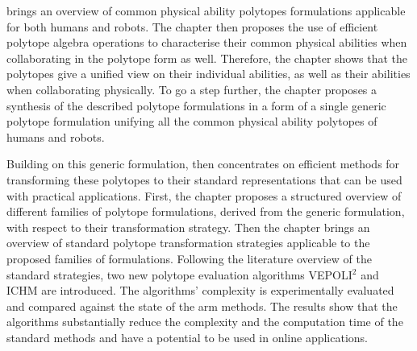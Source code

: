 
 brings an overview of common physical ability polytopes formulations applicable for both humans and robots. The chapter then proposes the use of efficient polytope algebra operations to characterise their common physical abilities when collaborating in the polytope form as well. Therefore, the chapter shows that the polytopes give a unified view on their individual abilities, as well as their abilities when collaborating physically. To go a step further, the chapter proposes a synthesis of the described polytope formulations in a form of a single generic polytope formulation unifying all the common physical ability polytopes of humans and robots.



Building on this generic formulation,  then concentrates on efficient methods for transforming these polytopes to their standard representations that can be used with practical applications. First, the chapter proposes a structured overview of different families of polytope formulations, derived from the generic formulation, with respect to their transformation strategy. Then the chapter brings an overview of standard polytope transformation strategies applicable to the proposed families of formulations. 
Following the literature overview of the standard strategies, two new polytope evaluation algorithms VEPOLI$^2$ and ICHM are introduced. The algorithms' complexity is experimentally evaluated and compared against the state of the arm methods. The results show that the algorithms substantially reduce the complexity and the computation time of the standard methods and have a potential to be used in online applications.

